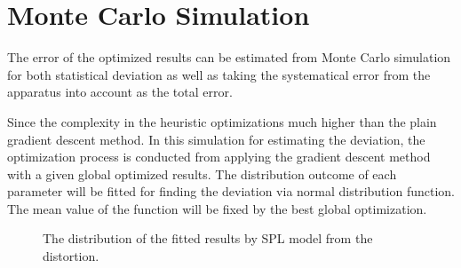 \chapter{Monte Carlo Simulation}
\label{appendix:montecarlo}

The error of the optimized results can be estimated 
from Monte Carlo simulation for both statistical deviation as well as 
taking the systematical error from the apparatus into account
as the total error.

Since the complexity in the heuristic optimizations much higher 
than the plain gradient descent method. In this simulation 
for estimating the deviation, the optimization process is conducted
from applying the gradient descent method with a given global 
optimized results. The distribution outcome of each parameter will be
fitted for finding the deviation via normal distribution function. 
The mean value of the function will be fixed by the best global 
optimization.


\begin{figure}[h!]
    \centering
        \hfill
        \caption{
            The distribution of the fitted results by SPL model
            from the distortion.
        }
       \label{fig:monte_spl}
\end{figure}

